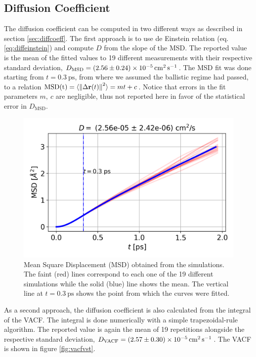 \documentclass[%
aps,
pra,%
amsmath,amssymb,
preprint,%
reprint,%
notitlepage,
a4paper]{revtex4-1}
\newcommand{\average}[1]{\langle #1 \rangle}
\begin{document}
\subsection{Diffusion Coefficient}
The diffusion coefficient can be computed in two different ways as described in section \ref{sec:diffcoeff}. The first approach is to use de Einstein relation (eq. \ref{eq:diffeinstein}) and compute $D$ from the slope of the MSD. The reported value is the mean of the fitted values to 19 different measurements with their respective standard deviation, $D_{\mathrm{MSD}} = \SI{2.56 \pm 0.24 e-5}{\square\centi\meter\per\second}$. The MSD fit was done starting from $t = \SI{0.3}{\pico\second}$, from where we assumed the ballistic regime had passed, to a relation $\mathrm{MSD(t)}  = \average{\norm{\Delta\vb{r}(t)}^2}= mt + c$. Notice that errors in the fit parameters $m,\ c$ are negligible, thus not reported here in favor of the statistical error in $D_{\mathrm{MSD}}$.\\
\begin{figure}
	\centering
	\includegraphics[width=0.9\linewidth]{../task2/results/msdvst}
	\caption{Mean Square Displacement (MSD) obtained from the simulations. The faint (red) lines correspond to each one of the 19 different simulations while the solid (blue) line shows the mean. The vertical line at $t = \SI{0.3}{\pico\second}$ shows the point from which the curves were fitted.}
	\label{fig:msdvst}
\end{figure}
As a second approach, the diffusion coefficient is also calculated from the integral of the VACF. The integral is done numerically with a simple trapezoidal-rule algorithm. The reported value is again the mean of 19 repetitions alongside the respective standard deviation, $D_\mathrm{VACF} = \SI{2,57 \pm 0.3 e-5}{\square\centi\meter\per\second}$. The VACF is shown in figure \ref{fig:vacfvst}.\\
\end{document}

